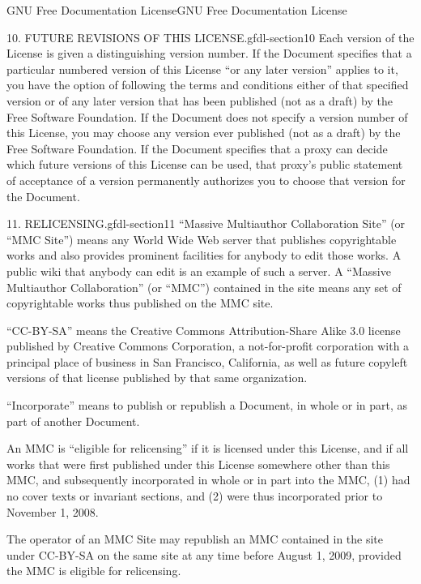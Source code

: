 \documentclass[10pt,]{book}
\numberwithin{equation}{section}
\begin{document}
\begin{appendixptx}{GNU Free Documentation License}{}{GNU Free Documentation License}{}{}
\begin{paragraphs}{10. FUTURE REVISIONS OF THIS LICENSE.}{gfdl-section10}
Each version of the License is given a distinguishing version number. If the Document specifies that a particular numbered version of this License ``or any later version'' applies to it, you have the option of following the terms and conditions either of that specified version or of any later version that has been published (not as a draft) by the Free Software Foundation. If the Document does not specify a version number of this License, you may choose any version ever published (not as a draft) by the Free Software Foundation. If the Document specifies that a proxy can decide which future versions of this License can be used, that proxy's public statement of acceptance of a version permanently authorizes you to choose that version for the Document.%
\end{paragraphs}%
\begin{paragraphs}{11. RELICENSING.}{gfdl-section11}%
\hypertarget{p-1364}{}%
``Massive Multiauthor Collaboration Site'' (or ``MMC Site'') means any World Wide Web server that publishes copyrightable works and also provides prominent facilities for anybody to edit those works. A public wiki that anybody can edit is an example of such a server. A ``Massive Multiauthor Collaboration'' (or ``MMC'') contained in the site means any set of copyrightable works thus published on the MMC site.%
\par
\hypertarget{p-1365}{}%
``CC-BY-SA'' means the Creative Commons Attribution-Share Alike 3.0 license published by Creative Commons Corporation, a not-for-profit corporation with a principal place of business in San Francisco, California, as well as future copyleft versions of that license published by that same organization.%
\par
\hypertarget{p-1366}{}%
``Incorporate'' means to publish or republish a Document, in whole or in part, as part of another Document.%
\par
\hypertarget{p-1367}{}%
An MMC is ``eligible for relicensing'' if it is licensed under this License, and if all works that were first published under this License somewhere other than this MMC, and subsequently incorporated in whole or in part into the MMC, (1) had no cover texts or invariant sections, and (2) were thus incorporated prior to November 1, 2008.%
\par
\hypertarget{p-1368}{}%
The operator of an MMC Site may republish an MMC contained in the site under CC-BY-SA on the same site at any time before August 1, 2009, provided the MMC is eligible for relicensing.%
\end{paragraphs}%

\end{appendixptx}
\end{document}
